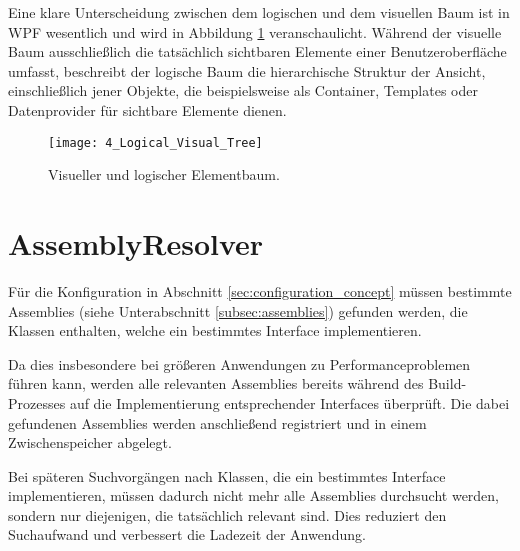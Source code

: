 Eine klare Unterscheidung zwischen dem logischen und dem visuellen Baum ist in WPF \cite{microsoft_trees_in_wpf} wesentlich und wird in Abbildung \ref{fig:logical_visual_tree} veranschaulicht. Während der visuelle Baum ausschließlich die tatsächlich sichtbaren Elemente einer Benutzeroberfläche umfasst, beschreibt der logische Baum die hierarchische Struktur der Ansicht, einschließlich jener Objekte, die beispielsweise als Container, Templates oder Datenprovider für sichtbare Elemente dienen.

\begin{figure}[H]
    \centering
    \texttt{[image: 4\_Logical\_Visual\_Tree]}
    \caption{Visueller und logischer Elementbaum.}
    \label{fig:logical_visual_tree}
\end{figure}

\section{AssemblyResolver}
\label{sec:assembly_resolver}
Für die Konfiguration in Abschnitt \ref{sec:configuration_concept} müssen bestimmte Assemblies (siehe Unterabschnitt \ref{subsec:assemblies}) gefunden werden, die Klassen enthalten, welche ein bestimmtes Interface implementieren.

Da dies insbesondere bei größeren Anwendungen zu Performanceproblemen führen kann, werden alle relevanten Assemblies bereits während des Build-Prozesses auf die Implementierung entsprechender Interfaces überprüft. Die dabei gefundenen Assemblies werden anschließend registriert und in einem Zwischenspeicher abgelegt.

Bei späteren Suchvorgängen nach Klassen, die ein bestimmtes Interface implementieren, müssen dadurch nicht mehr alle Assemblies durchsucht werden, sondern nur diejenigen, die tatsächlich relevant sind. Dies reduziert den Suchaufwand und verbessert die Ladezeit der Anwendung.